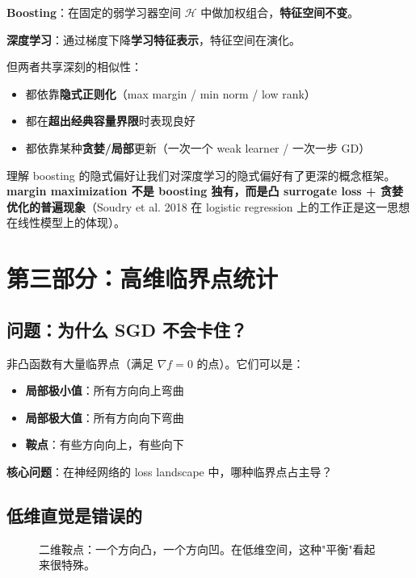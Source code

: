 \documentclass[12pt, a4paper]{ctexart}
\begin{document}
\begin{insight}[两种范式的深层联系]
\textbf{Boosting}：在固定的弱学习器空间 $\mathcal{H}$ 中做加权组合，\textbf{特征空间不变}。

\textbf{深度学习}：通过梯度下降\textbf{学习特征表示}，特征空间在演化。

但两者共享深刻的相似性：
\begin{itemize}
\item 都依靠\textbf{隐式正则化}（max margin / min norm / low rank）
\item 都在\textbf{超出经典容量界限}时表现良好
\item 都依靠某种\textbf{贪婪/局部}更新（一次一个 weak learner / 一次一步 GD）
\end{itemize}

理解 boosting 的隐式偏好让我们对深度学习的隐式偏好有了更深的概念框架。\textbf{margin maximization 不是 boosting 独有，而是凸 surrogate loss + 贪婪优化的普遍现象}（Soudry et al. 2018 在 logistic regression 上的工作正是这一思想在线性模型上的体现）。
\end{insight}


\section{第三部分：高维临界点统计}

\subsection{问题：为什么 SGD 不会卡住？}

非凸函数有大量临界点（满足 $\nabla f = 0$ 的点）。它们可以是：
\begin{itemize}
    \item \textbf{局部极小值}：所有方向向上弯曲
    \item \textbf{局部极大值}：所有方向向下弯曲
    \item \textbf{鞍点}：有些方向向上，有些向下
\end{itemize}

\textbf{核心问题}：在神经网络的 loss landscape 中，哪种临界点占主导？

\subsection{低维直觉是错误的}

\begin{figure}[ht]
\centering
{}
\caption{二维鞍点：一个方向凸，一个方向凹。在低维空间，这种"平衡"看起来很特殊。}
\end{figure}
\end{document}
